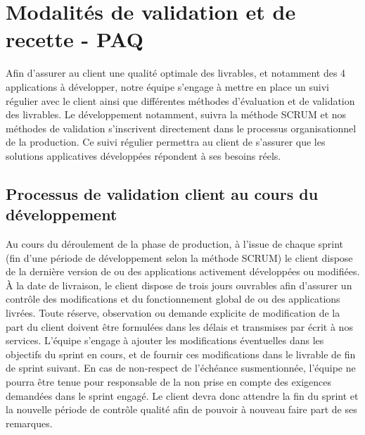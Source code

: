 \documentclass[a4paper]{article}
\begin{document}
	\newpage
	\hypertarget{H}{}
	\section{Modalités de validation et de recette - PAQ}
    	Afin d’assurer au client une qualité optimale des livrables, et notamment des 4 applications à développer, notre équipe s’engage à mettre en place un suivi régulier avec le client ainsi que différentes méthodes d’évaluation et de validation des livrables. Le développement notamment, suivra la méthode SCRUM et nos méthodes de validation s’inscrivent directement dans le processus organisationnel de la production. Ce suivi régulier permettra au client de s’assurer que les solutions applicatives développées répondent à ses besoins réels. 

        \subsection*{Processus de validation client au cours du développement}
    Au cours du déroulement de la phase de production, à l’issue de chaque sprint (fin d’une période de développement selon la méthode SCRUM) le client dispose de la dernière version de ou des applications activement développées ou modifiées. À la date de livraison, le client dispose de trois jours ouvrables afin d’assurer un contrôle des modifications et du fonctionnement global de ou des applications livrées. Toute réserve, observation ou demande explicite de modification de la part du client doivent être formulées dans les délais et transmises par écrit à nos services. L’équipe s’engage à ajouter les modifications éventuelles dans les objectifs du sprint en cours, et de fournir ces modifications dans le livrable de fin de sprint suivant. En cas de non-respect de l’échéance susmentionnée, l’équipe ne pourra être tenue pour responsable de la non prise en compte des exigences demandées dans le sprint engagé. Le client devra donc attendre la fin du sprint et la nouvelle période de contrôle qualité afin de pouvoir à nouveau faire part de ses remarques. 
     
\end{document}
